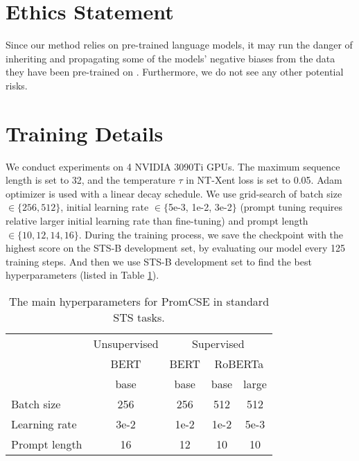 \documentclass[11pt]{article}
\begin{document}
\section*{Ethics Statement}
Since our method relies on pre-trained language models, it may run the danger of inheriting and propagating some of the models' negative biases from the data they have been pre-trained on \cite{BenderGMS21bias}. Furthermore, we do not see any other potential risks.





\appendix

\section{Training Details}
\label{sec:appendix a}
We conduct experiments on 4 NVIDIA 3090Ti GPUs. The maximum sequence length is set to 32, and the temperature $\tau$ in NT-Xent loss is set to 0.05. Adam optimizer is used with a linear decay schedule.
We use grid-search of batch size $\in\{256, 512\}$, initial learning rate $\in\{$5e-3, 1e-2, 3e-2$\}$ (prompt tuning requires relative larger initial learning rate than fine-tuning) and prompt length $\in\{10, 12, 14, 16\}$. 
During the training process, we save the checkpoint with the highest score on the STS-B development set, by evaluating our model every 125 training steps. And then we use STS-B development set to find the best hyperparameters (listed in Table \ref{tab: param}).


\begin{table}[!h]
\small
\centering
\begin{tabular}{lcccc}
\toprule
 & Unsupervised & \multicolumn{3}{c}{Supervised}                         \\
 & BERT         & BERT & \multicolumn{2}{c}{RoBERTa} \\
 & base         & base & base         & large \\
\midrule
Batch size    & 256         & 256        & 512           & 512          \\
Learning rate & 3e-2        & 1e-2       & 1e-2         & 5e-3         \\
Prompt length & 16        & 12       & 10         & 10         \\
 \bottomrule
\end{tabular}
\caption{\label{tab: param}
The main hyperparameters for PromCSE in standard STS tasks.}
\end{table}
\end{document}
